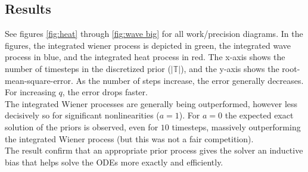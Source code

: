\subsection*{Results}
See figures \ref{fig:heat} through \ref{fig:wave big} for all work/precision diagrams. In the figures, the integrated wiener process is depicted in green, the integrated wave process in blue, and the integrated heat process in red. The x-axis shows the number of timesteps in the discretized prior ($|\mathbb{T}|$), and the y-axis shows the root-mean-square-error. As the number of steps increase, the error generally decreases. For increasing $q$, the error drops faster.
\\ The integrated Wiener processes are generally being outperformed, however less decisively so for significant nonlinearities ($a = 1$). For $a=0$ the expected exact solution of the priors is observed, even for $10$ timesteps, massively outperforming the integrated Wiener process (but this was not a fair competition).
\\ The result confirm that an appropriate prior process gives the solver an inductive bias that helps solve the ODEs more exactly and efficiently.
